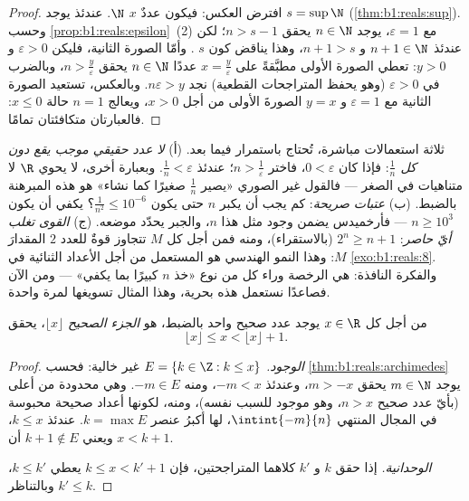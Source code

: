 \begin{proof}
افترض العكس: فيكون عددٌ $x$   $\N$. عندئذ يوجد $s = \sup \N$
(\cref{thm:b1:reals:sup}). وحسب
\cref{prop:b1:reals:epsilon}~(2) مع $\varepsilon = 1$، يوجد $n
\in \N$ يحقق $n > s - 1$؛ لكن عندئذ $n + 1 \in \N$ و $n + 1 > s$،
وهذا يناقض كون $s$ . وأمّا الصورة الثانية،
فليكن $\varepsilon > 0$ و $y > 0$: تعطي الصورة الأولى مطبَّقةً على $x
= \frac{y}{\varepsilon}$ عددًا $n \in \N$ يحقق $n >
\frac{y}{\varepsilon}$، وبالضرب في $\varepsilon > 0$
(وهو يحفظ المتراجحات القطعية) نجد $n\varepsilon > y$.
وبالعكس، تستعيد الصورة الثانية مع $\varepsilon = 1$ و $y = x$
الصورةَ الأولى من أجل $x > 0$، ويعالج $n = 1$ حالة $x \leq 0$:
فالعبارتان متكافئتان تمامًا.
\end{proof}

\begin{example}\label{ex:b1:reals:archimedeswork}
ثلاثة استعمالات مباشرة، تُحتاج باستمرار فيما بعد. (أ) \emph{لا
عدد حقيقي موجب يقع دون كل $\frac1n$}: فإذا كان $0 < \varepsilon$،
فاختر $n > \frac1\varepsilon$؛ عندئذ $\frac1n < \varepsilon$. وبعبارة
أخرى، لا يحوي $\R$ لا متناهيات في الصغر --- فالقول غير الصوري
«يصير $\frac1n$ صغيرًا كما نشاء» هو هذه المبرهنة بالضبط.
(ب) \emph{عتبات صريحة}: كم يجب أن يكبر $n$ حتى يكون
$\frac{1}{n^2} \leq 10^{-6}$؟ يكفي أن يكون $n \geq 10^3$
--- فأرخميدس يضمن وجود مثل هذا $n$، والجبر
يحدّد موضعه. (ج) \emph{القوى تغلب أيّ حاصر}: $2^n \geq n +
1$ (بالاستقراء)، ومنه فمن أجل كل $M$ تتجاوز قوةٌ للعدد $2$ المقدارَ $M$:
وهذا النمو الهندسي هو المستعمل من أجل الأعداد الثنائية في
\cref{exo:b1:reals:8}. والفكرة النافذة:  هي الرخصة وراء كل  من نوع «خذ
$n$ كبيرًا بما يكفي» --- ومن الآن فصاعدًا نستعمل هذه  بحرية،
وهذا المثال تسويغها لمرة واحدة.
\end{example}

\begin{theorem}\label{thm:b1:reals:floor}
من أجل كل $x \in \R$ يوجد عدد صحيح واحد بالضبط، هو
\emph{الجزء الصحيح} $\lfloor x \rfloor$، يحقق
\[
\lfloor x \rfloor \leq x < \lfloor x \rfloor + 1 .
\]
\end{theorem}

\begin{proof}
\emph{الوجود.}  $E = \{k \in \Z : k \leq x\}$ غير خالية:
فحسب \cref{thm:b1:reals:archimedes} يوجد $m \in \N$ يحقق $m > -x$،
وعندئذ $-m < x$، ومنه $-m \in E$. وهي محدودة من أعلى (بأيّ عدد صحيح
$n > x$، وهو موجود للسبب نفسه)، ومنه، لكونها  أعداد
صحيحة محبوسة في المجال المنتهي $\intint{-m}{n}$، لها
أكبرُ عنصر $k = \max E$. عندئذ $k \leq x$، ويعني $k + 1 \notin E$
أن $x < k + 1$.

\emph{الوحدانية.} إذا حقق $k$ و $k'$ كلاهما المتراجحتين،
فإن $k \leq x < k' + 1$ يعطي $k \leq k'$، وبالتناظر $k'
\leq k$.
\end{proof}

